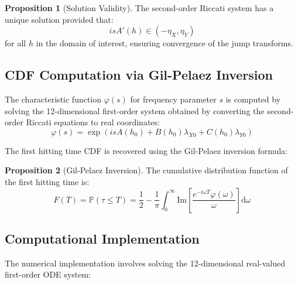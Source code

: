 \documentclass{article}
\renewcommand{\P}{\mathbb{P}}
\newcommand{\diff}{\mathrm{d}}
\theoremstyle{definition}
\newtheorem{proposition}{Proposition}[section]
\begin{document}
\begin{proposition}[Solution Validity]
\label{prop:validity}
The second-order Riccati system has a unique solution provided that:
\begin{equation}
i s A'(h) \in (-\eta_X, \eta_Y) \label{eq:validity_condition}
\end{equation}
for all $h$ in the domain of interest, ensuring convergence of the jump transforms.
\end{proposition}

\subsection{CDF Computation via Gil-Pelaez Inversion}

The characteristic function $\varphi(s)$ for frequency parameter $s$ is computed by solving the 12-dimensional first-order system obtained by converting the second-order Riccati equations to real coordinates:
\begin{equation}
\varphi(s) = \exp\!\left( i s A(h_0) + B(h_0)\lambda_{X0} + C(h_0)\lambda_{Y0} \right)
\end{equation}

The first hitting time CDF is recovered using the Gil-Pelaez inversion formula:

\begin{proposition}[Gil-Pelaez Inversion]
\label{prop:gilpelaez}
The cumulative distribution function of the first hitting time is:
\begin{equation}
F(T) = \P(\tau \leq T) = \frac{1}{2} - \frac{1}{\pi} \int_0^{\infty} \text{Im}\left[\frac{e^{-i\omega T} \varphi(\omega)}{\omega}\right] \diff\omega \label{eq:gil_pelaez}
\end{equation}
\end{proposition}

\subsection{Computational Implementation}

The numerical implementation involves solving the 12-dimensional real-valued first-order ODE system:
\end{document}
